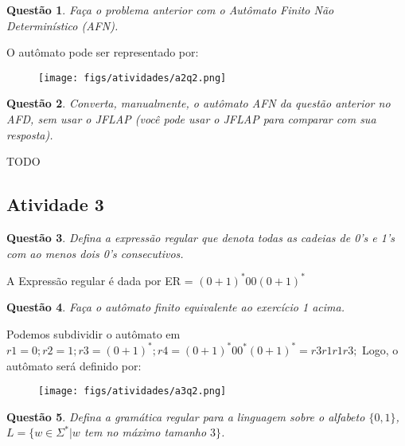 \documentclass{article}
\newtheorem{problem}{Questão}
\begin{document}
\begin{problem}
     Faça o problema anterior com o Autômato Finito Não Determinístico (AFN).
\end{problem}

\begin{solution}
    O autômato pode ser representado por:

\begin{figure}[H]
        \centering
        \texttt{[image: figs/atividades/a2q2.png]}
\end{figure}
\end{solution}

\begin{problem} Converta, manualmente, o autômato AFN da questão anterior no AFD, sem usar o JFLAP (você pode usar o JFLAP para comparar com sua resposta).
\end{problem}

\begin{solution}
    TODO
\end{solution}
\subsection{Atividade 3}
\begin{problem} Defina a expressão regular que denota todas as cadeias de 0's e 1's com ao menos dois 0's consecutivos.
\end{problem}

\begin{solution}
    A Expressão regular é dada por ER = $(0 + 1)^*00(0 + 1)^*$
\end{solution}

\begin{problem} Faça o autômato finito equivalente ao exercício 1 acima.
\end{problem}

\begin{solution}
Podemos subdividir o autômato em $r1 = 0; r2 = 1; r3 = (0 + 1)^*; r4 = (0 + 1)^*00^*(0 + 1)^* = r3r1r1r3;$ Logo, o autômato será definido por:
    \begin{figure}[H]
        \centering
        \texttt{[image: figs/atividades/a3q2.png]}
    \end{figure}
\end{solution}

\begin{problem} Defina a gramática regular para a linguagem sobre o alfabeto $\{0,1\}$, $L = \{w\in \Sigma^{*} | w$ tem no máximo tamanho $3\}$.
\end{problem}
\end{document}
